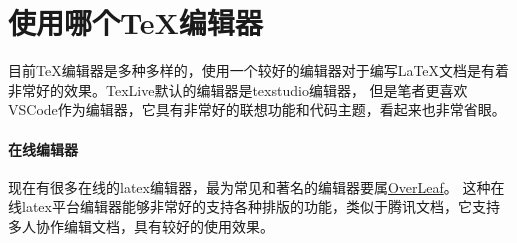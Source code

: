 \section{使用哪个\TeX 编辑器}
目前\TeX 编辑器是多种多样的，使用一个较好的编辑器对于编写\LaTeX 文档是有着非常好的效果。TexLive默认的编辑器是texstudio编辑器，
但是笔者更喜欢VSCode作为编辑器，它具有非常好的联想功能和代码主题，看起来也非常省眼。

\paragraph{在线编辑器} 现在有很多在线的latex编辑器，最为常见和著名的编辑器要属\href{https://overleaf.com/}{OverLeaf}。
这种在线latex平台编辑器能够非常好的支持各种排版的功能，类似于腾讯文档，它支持多人协作编辑文档，具有较好的使用效果。





